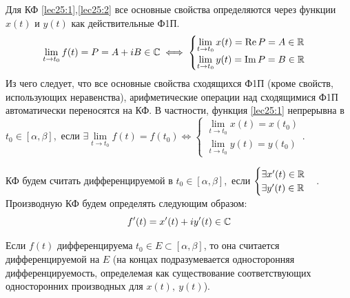 \documentclass[../../main.tex]{subfiles}
\begin{document}
\hfill

Для КФ \eqref{lec25:1},\eqref{lec25:2}  все основные свойства определяются
через функции $x(t)$ и $y(t)$ как действительные Ф1П.
\[
\lim\limits_{t \to t_0}  f(t) = P = A + iB \in \mathbb{C} \iff
\begin{cases}
	\lim\limits_{t \to t_0}  x(t)  = \operatorname{Re} P = A \in \mathbb{R} \\
	\lim\limits_{t \to t_0}  y(t)  = \operatorname{Im} P = B \in \mathbb{R}
\end{cases} 
\]
Из чего следует, что  все основные свойства сходящихся Ф1П 
(кроме свойств, использующих неравенства),
арифметические операции над сходящимися Ф1П автоматически переносятся на КФ.
В частности, функция \eqref{lec25:1} непрерывна в $t_0 \in [\alpha,\beta ]$,\   если 
$\exists \lim\limits_{t \to t_0}  f(t) = f(t_0) \iff 
\begin{cases}
	\lim\limits_{t \to t_0}  x(t)  = x(t_0) \\
	\lim\limits_{t \to t_0}  y(t)  =  y(t_0)
\end{cases}$.

КФ будем считать дифференцируемой в $t_0 \in [\alpha,\beta ]$,\   если 
$\begin{cases}
	\exists x'(t)  \in \mathbb{R} \\
	\exists y'(t)  \in \mathbb{R}
\end{cases}$. Производную КФ будем определять следующим образом:
\[
	f'(t) = x'(t) + iy'(t) \in \mathbb{C}
\]

Если $f(t)$ дифференцируема $t_0 \in E \subset [\alpha,\beta ]$, 
то она считается дифференцируемой на $E$ (на концах 
подразумевается односторонняя дифференцируемость,
определемая как существование соответствующих 
односторонних производных для $x(t), \ y(t)$).
\end{document}
